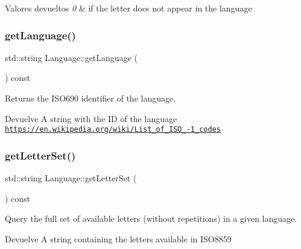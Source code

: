 \begin{DoxyRetVals}{Valores devueltos}
{\em 0} & if the letter does not appear in the language \\
\hline
\end{DoxyRetVals}
\mbox{\label{classLanguage_ae601aeb3adba71b80ca3eb25310bed58}} 
\subsubsection{\texorpdfstring{get\+Language()}{getLanguage()}}
{\footnotesize\ttfamily std\+::string Language\+::get\+Language (\begin{DoxyParamCaption}{ }\end{DoxyParamCaption}) const}



Returns the I\+S\+O690 identifier of the language. 

\begin{DoxyReturn}{Devuelve}
A string with the ID of the language \href{https://en.wikipedia.org/wiki/List_of_ISO_639-1_codes}{\tt https\+://en.\+wikipedia.\+org/wiki/\+List\+\_\+of\+\_\+\+I\+S\+O\+\_-\/1\+\_\+codes} 
\end{DoxyReturn}
\mbox{\label{classLanguage_ad72e0fe4a285a849d217a1b9251c79f1}} 
\subsubsection{\texorpdfstring{get\+Letter\+Set()}{getLetterSet()}}
{\footnotesize\ttfamily std\+::string Language\+::get\+Letter\+Set (\begin{DoxyParamCaption}{ }\end{DoxyParamCaption}) const}



Query the full set of available letters (without repetitions) in a given language. 

\begin{DoxyReturn}{Devuelve}
A string containing the letters available in I\+S\+O8859 
\end{DoxyReturn}
\mbox{\label{classLanguage_a02f7ca8ab721b358955c50df51de6df1}} 
